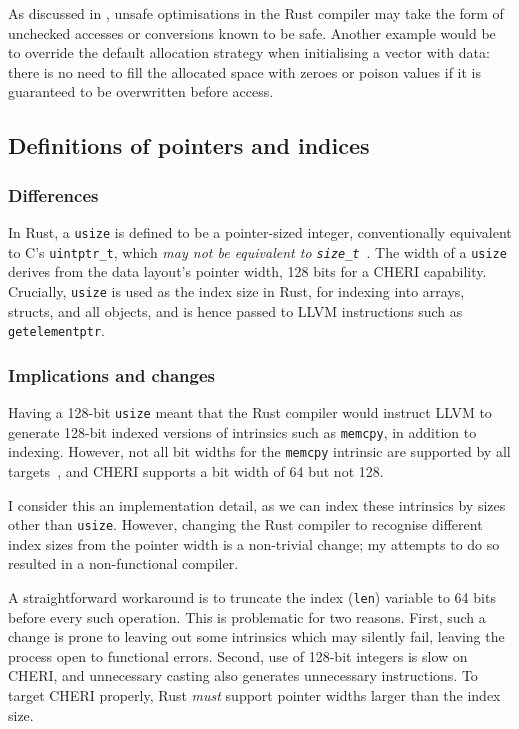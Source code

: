 \documentclass[dissertation.tex]{subfiles}
\begin{document}
As discussed in , unsafe optimisations in
the Rust compiler may take the form of unchecked accesses or conversions
known to be safe.
Another example would be to override the default allocation strategy
when initialising a vector with data: there is no need to fill the
allocated space with zeroes or poison values if it is guaranteed to be
overwritten before access.


\subsection{Definitions of pointers and indices}
\label{sec:rust-usize}

\subsubsection{Differences}
In Rust, a \texttt{usize} is defined to be a pointer-sized integer,
conventionally equivalent to C's \texttt{uintptr\_t}, which \emph{may
not be equivalent to \texttt{size\_t}}~\cite{rust-rfc-isize}.
The width of a \texttt{usize} derives from the data layout's pointer
width, 128 bits for a CHERI capability.
Crucially, \texttt{usize} is used as the index size in Rust, for
indexing into arrays, structs, and all objects, and is hence passed to
LLVM instructions such as \texttt{getelementptr}.

\subsubsection{Implications and changes}
Having a 128-bit \texttt{usize} meant that the Rust compiler would
instruct LLVM to generate 128-bit indexed versions of intrinsics such as
\texttt{memcpy}, in addition to indexing.
However, not all bit widths for the \texttt{memcpy} intrinsic are
supported by all targets~\cite{llvm-langref}, and CHERI supports a bit
width of 64 but not 128.

I consider this an implementation detail, as we can index these
intrinsics by sizes other than \texttt{usize}.
However, changing the Rust compiler to recognise different index sizes
from the pointer width is a non-trivial change; my attempts to do so
resulted in a non-functional compiler.

A straightforward workaround is to truncate the index (\texttt{len})
variable to 64 bits before every such operation.
This is problematic for two reasons.
First, such a change is prone to leaving out some intrinsics which may
silently fail, leaving the process open to functional errors.
Second, use of 128-bit integers is slow on CHERI, and unnecessary
casting also generates unnecessary instructions.
To target CHERI properly, Rust \emph{must} support pointer widths larger
than the index size.
\end{document}

